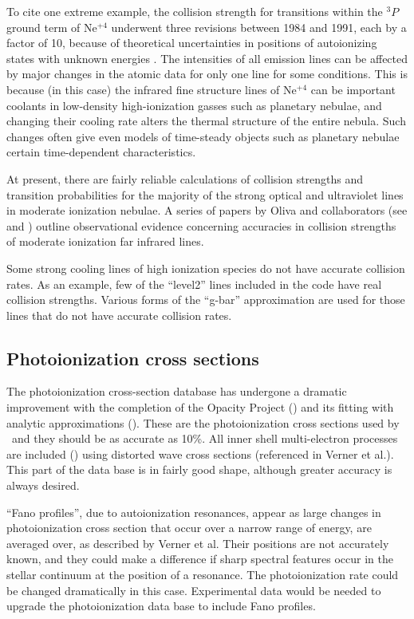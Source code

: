To cite one extreme example,
the collision strength for transitions within
the $^3P$ ground term of Ne$^{+4}$
underwent three revisions between 1984 and 1991,
each by a factor of 10,
because of theoretical uncertainties in positions
of autoionizing states with unknown energies
\citep{Lennon1991}.  The
intensities of all emission lines can be affected by major changes in the
atomic data for only one line for some conditions.  This is because (in
this case) the infrared fine structure lines of Ne$^{+4}$ can be important
coolants in low-density high-ionization gasses such as planetary nebulae,
and changing their cooling rate alters the thermal structure of the entire
nebula.  Such changes often give even models of time-steady objects such
as planetary nebulae certain time-dependent characteristics.

At present, there are fairly reliable calculations of collision
strengths and transition probabilities for the majority of the strong
optical and ultraviolet lines in moderate ionization nebulae.  A
series of papers by Oliva and collaborators (see \citealp{Oliva1996}
and \citealp{VanHoof2000a})
outline observational evidence concerning accuracies in collision
strengths of moderate ionization far infrared lines.

Some strong cooling lines of high ionization species do not have accurate
collision rates.
As an example, few of the ``level2'' lines included in
the code have real collision strengths.
Various forms of the ``g-bar''
approximation are used for those lines that do not have accurate collision
rates.

\subsection{Photoionization cross sections}

The photoionization cross-section database has undergone a dramatic
improvement with the completion of the Opacity Project (\citealp{Seaton1987}) and
its fitting with analytic approximations (\citealp{VernerFerlandKorista1996}).
These
are the photoionization cross sections used by \Cloudy\ and
they should be
as accurate as 10\%.
All inner shell multi-electron processes are included
(\citealp{Kaastra1993}) using distorted wave cross sections (referenced
in Verner et al.).
This part of the data base is in fairly good shape,
although greater accuracy is always desired.

``Fano profiles'', due to autoionization resonances, appear as large
changes in photoionization cross section that occur over a narrow range
of energy, are averaged over, as described by Verner et al.
Their positions
are not accurately known, and they could make a difference
if sharp spectral
features occur in the stellar continuum at the position of a resonance.
The photoionization rate could be changed dramatically in this case.
Experimental data would be needed to upgrade the photoionization data base
to include Fano profiles.

